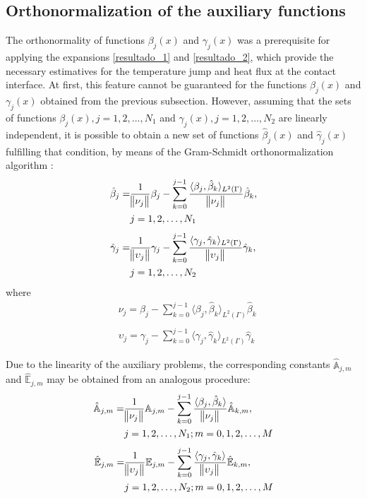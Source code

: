 \documentclass[12pt]{CHT-20}
\begin{document}
\subsection*{Orthonormalization of the auxiliary functions}
The orthonormality of functions $\beta_j(x)$ and $\gamma_j(x)$ was a prerequisite for applying the expansions \eqref{resultado_1} and \eqref{resultado_2}, which provide the necessary estimatives for the temperature jump and heat flux at the contact interface. At first, this feature cannot be guaranteed for the functions $\beta_j(x)$ and $\gamma_j(x)$ obtained from the previous subsection. However, assuming that the sets of functions $\beta_j(x), j=1,2,\dots, N_1$ and $\gamma_j(x), j=1,2,\dots, N_2$ are linearly independent, it is possible to obtain a new set of functions $\hat{\beta}_j(x)$ and $\hat{\gamma}_j(x)$ fulfilling that condition, by means of the Gram-Schmidt orthonormalization algorithm \citep{livro_axler}:
\begin{align}
\hat{\beta}_j = & \frac{1}{\norm{\nu_j}}\beta_j - \sum_{k=0}^{j-1} \frac{\langle \beta_j, \hat{\beta}_k \rangle_{L^2(\Gamma)}}{\norm{\nu_j}} \hat{\beta}_k \label{termo_beta} , \\
& j=1,2,\dots, N_1 
\end{align}
\begin{align}
\hat{\gamma}_j = & \frac{1}{\norm{\upsilon_j}}\gamma_j - \sum_{k=0}^{j-1} \frac{\langle \gamma_j, \hat{\gamma}_k \rangle_{L^2(\Gamma)}}{\norm{\upsilon_j}} \hat{\gamma}_k \label{termo_gamma},  \\
& j=1,2,\dots, N_2 \nonumber 
\end{align}
where
\begin{align}
& \nu_j = \beta_j - \sum_{k = 0}^{j - 1} \langle \beta_j, \hat{\beta}_k\rangle_{L^2(\Gamma)}\hat{\beta}_k \\ \nonumber \\
& \upsilon_j = \gamma_j - \sum_{k = 0}^{j - 1} \langle \gamma_j, \hat{\gamma}_k\rangle_{L^2(\Gamma)}\hat{\gamma}_k
\end{align}

Due to the linearity of the auxiliary problems, the corresponding constants $\hat{\mathbb{A}}_{j,m}$ and $\hat{\mathbb{E}}_{j,m}$ may be obtained from an analogous procedure:
\begin{align}
\hat{\mathbb{A}}_{j,m} = & \frac{1}{\norm{\nu_j}} \mathbb{A}_{j,m} - \sum_{k=0}^{j-1} \frac{\langle \beta_j, \hat{\beta}_k \rangle}{\norm{\nu_j}} \hat{\mathbb{A}}_{k,m}
\label{expressao_relaciona_psi} ,\\ 
& j=1,2,\dots, N_1; m=0,1,2,\ldots,M \nonumber
\end{align}
\begin{align}
\hat{\mathbb{E}}_{j,m} = & \frac{1}{\norm{\upsilon_j}} \mathbb{E}_{j,m} - \sum_{k=0}^{j-1} \frac{\langle \gamma_j, \hat{\gamma}_k \rangle}{\norm{\upsilon_j}} \hat{\mathbb{E}}_{k,m}
\label{expressao_relaciona_zeta} , \\
& j=1,2,\dots, N_2 ; m=0,1,2,\ldots,M  \nonumber 
\end{align}
\end{document}
